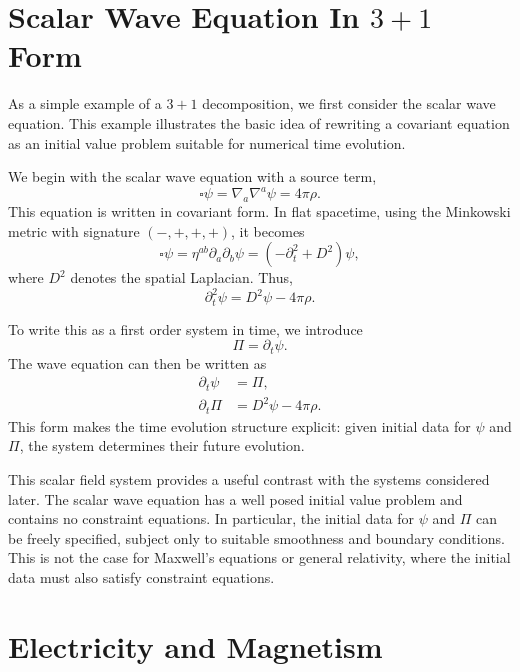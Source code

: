 \section{Scalar Wave Equation In $3+1$ Form}

As a simple example of a $3+1$ decomposition, we first consider the scalar wave equation. This example illustrates the basic idea of rewriting a covariant equation as an initial value problem suitable for numerical time evolution.

We begin with the scalar wave equation with a source term,
\begin{equation}
\square \psi = \nabla_a \nabla^a \psi = 4\pi \rho .
\end{equation}
This equation is written in covariant form. In flat spacetime, using the Minkowski metric with signature $(-,+,+,+)$, it becomes
\begin{equation}
\square \psi
=
\eta^{ab}\partial_a\partial_b \psi
=
\left(-\partial_t^2 + D^2\right)\psi ,
\end{equation}
where $D^2$ denotes the spatial Laplacian. Thus,
\begin{equation}
\partial_t^2 \psi = D^2 \psi - 4\pi \rho .
\end{equation}

To write this as a first order system in time, we introduce
\begin{equation}
\Pi = \partial_t \psi .
\end{equation}
The wave equation can then be written as
\begin{align}
\partial_t \psi &= \Pi , \\
\partial_t \Pi &= D^2 \psi - 4\pi \rho .
\end{align}
This form makes the time evolution structure explicit: given initial data for $\psi$ and $\Pi$, the system determines their future evolution.

This scalar field system provides a useful contrast with the systems considered later. The scalar wave equation has a well posed initial value problem and contains no constraint equations. In particular, the initial data for $\psi$ and $\Pi$ can be freely specified, subject only to suitable smoothness and boundary conditions. This is not the case for Maxwell's equations or general relativity, where the initial data must also satisfy constraint equations.

\section{Electricity and Magnetism}

